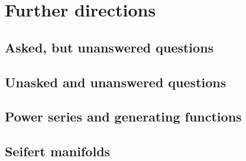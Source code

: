 \chapter{Further directions}
\section{Asked, but unanswered questions}
\section{Unasked and unanswered questions}
\section{Power series and generating functions}
\section{Seifert manifolds}
